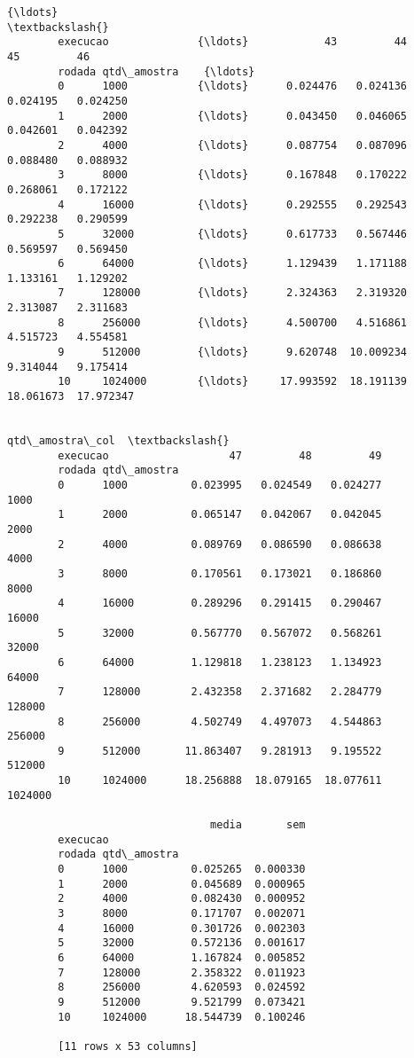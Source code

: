 \documentclass[11pt]{article}
\begin{document}
\begin{Verbatim}[commandchars=\\\{\}]
                              {\ldots}                                                 \textbackslash{}
        execucao              {\ldots}            43         44         45         46   
        rodada qtd\_amostra    {\ldots}                                                  
        0      1000           {\ldots}      0.024476   0.024136   0.024195   0.024250   
        1      2000           {\ldots}      0.043450   0.046065   0.042601   0.042392   
        2      4000           {\ldots}      0.087754   0.087096   0.088480   0.088932   
        3      8000           {\ldots}      0.167848   0.170222   0.268061   0.172122   
        4      16000          {\ldots}      0.292555   0.292543   0.292238   0.290599   
        5      32000          {\ldots}      0.617733   0.567446   0.569597   0.569450   
        6      64000          {\ldots}      1.129439   1.171188   1.133161   1.129202   
        7      128000         {\ldots}      2.324363   2.319320   2.313087   2.311683   
        8      256000         {\ldots}      4.500700   4.516861   4.515723   4.554581   
        9      512000         {\ldots}      9.620748  10.009234   9.314044   9.175414   
        10     1024000        {\ldots}     17.993592  18.191139  18.061673  17.972347   
        
                                                            qtd\_amostra\_col  \textbackslash{}
        execucao                   47         48         49                   
        rodada qtd\_amostra                                                    
        0      1000          0.023995   0.024549   0.024277            1000   
        1      2000          0.065147   0.042067   0.042045            2000   
        2      4000          0.089769   0.086590   0.086638            4000   
        3      8000          0.170561   0.173021   0.186860            8000   
        4      16000         0.289296   0.291415   0.290467           16000   
        5      32000         0.567770   0.567072   0.568261           32000   
        6      64000         1.129818   1.238123   1.134923           64000   
        7      128000        2.432358   2.371682   2.284779          128000   
        8      256000        4.502749   4.497073   4.544863          256000   
        9      512000       11.863407   9.281913   9.195522          512000   
        10     1024000      18.256888  18.079165  18.077611         1024000   
        
                                media       sem  
        execucao                                 
        rodada qtd\_amostra                       
        0      1000          0.025265  0.000330  
        1      2000          0.045689  0.000965  
        2      4000          0.082430  0.000952  
        3      8000          0.171707  0.002071  
        4      16000         0.301726  0.002303  
        5      32000         0.572136  0.001617  
        6      64000         1.167824  0.005852  
        7      128000        2.358322  0.011923  
        8      256000        4.620593  0.024592  
        9      512000        9.521799  0.073421  
        10     1024000      18.544739  0.100246  
        
        [11 rows x 53 columns]
\end{Verbatim}
\end{document}
